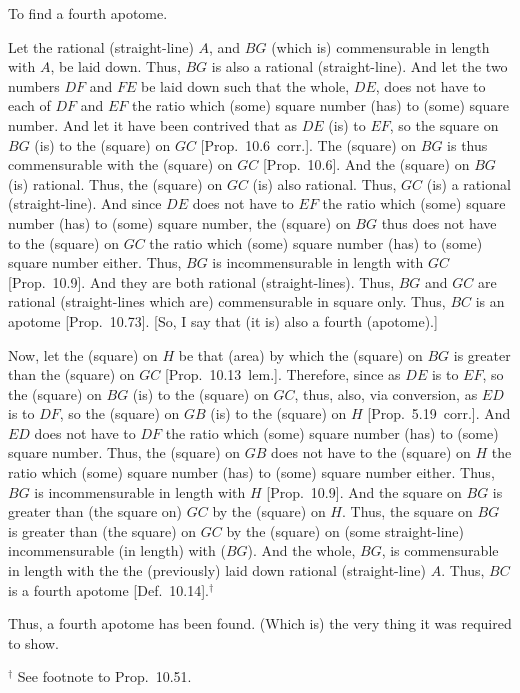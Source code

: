 \begin{Parallel}{}{}
{To find a fourth apotome.

\epsfysize=0.65in
\centerline{}

Let the rational (straight-line) $A$, and $BG$ (which is)
commensurable in length with $A$, be laid down.
Thus, $BG$ is also a rational (straight-line). And let the two numbers $DF$
and $FE$ be laid down such that the whole, $DE$, does not have to
each of $DF$ and $EF$ the ratio which (some) square number (has)
to (some) square number. And let it have been contrived that as $DE$
(is) to $EF$, so the square on $BG$ (is) to the (square) on $GC$
[Prop.~10.6~corr.]. The (square) on $BG$ is
thus commensurable with the (square) on $GC$ [Prop.~10.6]. And the (square) on $BG$ (is)
rational. Thus, the (square) on $GC$ (is) also rational. Thus, $GC$
(is) a rational (straight-line). And since $DE$ does not have to $EF$
the ratio which (some) square number (has) to (some) square number,
the (square) on $BG$ thus does not have to the (square) on $GC$ the
ratio which (some) square number (has) to (some) square number either.
Thus, $BG$ is incommensurable in length with $GC$ [Prop.~10.9]. And they are both rational (straight-lines). Thus, $BG$ and $GC$ are rational (straight-lines which are)
commensurable in square only. Thus, $BC$ is an apotome [Prop.~10.73]. [So, I say that
(it is) also a fourth (apotome).]

Now, let the (square) on $H$ be that (area) by which the (square)
on $BG$ is greater than the (square) on $GC$ [Prop.~10.13~lem.]. Therefore, since as
$DE$ is to $EF$, so the (square) on $BG$ (is) to the (square)
on $GC$, thus, also, via conversion, as $ED$ is to $DF$, so the
(square) on $GB$ (is) to the (square) on $H$ [Prop.~5.19~corr.]. And $ED$ does not have to
$DF$ the ratio which (some) square number (has) to (some) square number.
Thus, the (square) on $GB$ does not have to the (square) on $H$
the ratio which (some) square number (has) to (some) square number either.
Thus, $BG$ is incommensurable in length with $H$ [Prop.~10.9]. And the square on $BG$ is greater
than (the square on) $GC$ by the (square) on $H$. Thus, the
square on $BG$ is greater than (the square) on $GC$ by the (square)
on (some straight-line) incommensurable (in length) with ($BG$). And the whole,
$BG$, is commensurable in length with the the (previously) laid
down rational (straight-line) $A$. Thus, $BC$ is a fourth apotome
[Def.~10.14].$^\dag$

Thus, a fourth apotome has been found. (Which is) the very thing it was required to show.}
\end{Parallel}
{\footnotesize\noindent$^\dag$ See footnote to Prop.~10.51.}


